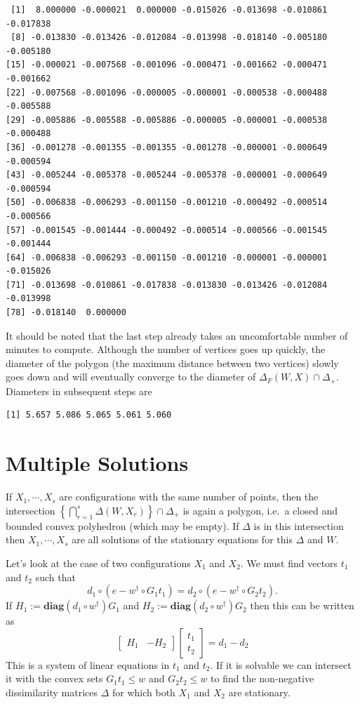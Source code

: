 \documentclass[
  12pt,
  letterpaper,
  DIV=11,
  numbers=noendperiod]{scrreprt}
\theoremstyle{remark}
\begin{document}
\begin{verbatim}
 [1]  8.000000 -0.000021  0.000000 -0.015026 -0.013698 -0.010861 -0.017838
 [8] -0.013830 -0.013426 -0.012084 -0.013998 -0.018140 -0.005180 -0.005180
[15] -0.000021 -0.007568 -0.001096 -0.000471 -0.001662 -0.000471 -0.001662
[22] -0.007568 -0.001096 -0.000005 -0.000001 -0.000538 -0.000488 -0.005588
[29] -0.005886 -0.005588 -0.005886 -0.000005 -0.000001 -0.000538 -0.000488
[36] -0.001278 -0.001355 -0.001355 -0.001278 -0.000001 -0.000649 -0.000594
[43] -0.005244 -0.005378 -0.005244 -0.005378 -0.000001 -0.000649 -0.000594
[50] -0.006838 -0.006293 -0.001150 -0.001210 -0.000492 -0.000514 -0.000566
[57] -0.001545 -0.001444 -0.000492 -0.000514 -0.000566 -0.001545 -0.001444
[64] -0.006838 -0.006293 -0.001150 -0.001210 -0.000001 -0.000001 -0.015026
[71] -0.013698 -0.010861 -0.017838 -0.013830 -0.013426 -0.012084 -0.013998
[78] -0.018140  0.000000
\end{verbatim}

It should be noted that the last step already takes an uncomfortable
number of minutes to compute. Although the number of vertices goes up
quickly, the diameter of the polygon (the maximum distance between two
vertices) slowly goes down and will eventually converge to the diameter
of \(\Delta_F(W,X)\cap\Delta_+\). Diameters in subsequent steps are

\begin{verbatim}
[1] 5.657 5.086 5.065 5.061 5.060
\end{verbatim}

\section{Multiple Solutions}\label{multiple-solutions}

If \(X_1,\cdots,X_s\) are configurations with the same number of points,
then the intersection
\(\left\{\bigcap_{r=1}^s\Delta(W,X_r)\right\}\cap\Delta_+\) is again a
polygon, i.e.~a closed and bounded convex polyhedron (which may be
empty). If \(\Delta\) is in this intersection then \(X_1,\cdots,X_s\)
are all solutions of the stationary equations for this \(\Delta\) and
\(W\).

Let's look at the case of two configurations \(X_1\) and \(X_2\). We
must find vectors \(t_1\) and \(t_2\) such that \[
d_1\circ(e-w^\dagger\circ G_1t_1)=d_2\circ(e-w^\dagger\circ G_2t_2).
\] If \(H_1:=\mathbf{diag}(d_1\circ w^\dagger)G_1\) and
\(H_2:=\mathbf{diag}(d_2\circ w^\dagger)G_2\) then this can be written
as \[
\begin{bmatrix}H_1&-H_2\end{bmatrix}\begin{bmatrix}t_1\\t_2\end{bmatrix}=d_1-d_2
\] This is a system of linear equations in \(t_1\) and \(t_2\). If it is
solvable we can intersect it with the convex sets \(G_1t_1\leq w\) and
\(G_2t_2\leq w\) to find the non-negative dissimilarity matrices
\(\Delta\) for which both \(X_1\) and \(X_2\) are stationary.
\end{document}
